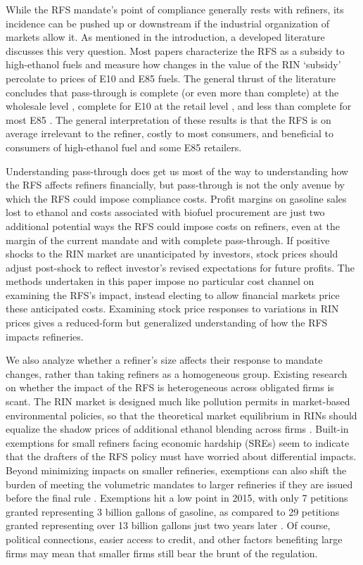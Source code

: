 \documentclass[11pt]{article}
\begin{document}
While the RFS mandate's point of compliance generally rests with refiners, its incidence can be pushed up or downstream if the industrial organization of markets allow it. As mentioned in the introduction, a developed literature discusses this very question. Most papers characterize the RFS as a subsidy to high-ethanol fuels and measure how changes in the value of the RIN `subsidy' percolate to prices of E10 and E85 fuels. The general thrust of the literature concludes that pass-through is complete (or even more than complete) at the wholesale level \citep{Knittel2017,Burkhardt2019,Lade2019}, complete for E10 at the retail level \citep{Pouliot2017,Lade2019,Li2019}, and less than complete for most E85 \citep{Lade2019,Li2019}. The general interpretation of these results is that the RFS is on average irrelevant to the refiner, costly to most consumers, and beneficial to consumers of high-ethanol fuel and some E85 retailers.

Understanding pass-through does get us most of the way to understanding how the RFS affects refiners financially, but pass-through is not the only avenue by which the RFS could impose compliance costs. Profit margins on gasoline sales lost to ethanol and costs associated with biofuel procurement are just two additional potential ways the RFS could impose costs on refiners, even at the margin of the current mandate and with complete pass-through. If positive shocks to the RIN market are unanticipated by investors, stock prices should adjust post-shock to reflect investor's revised expectations for future profits. The methods undertaken in this paper impose no particular cost channel on examining the RFS's impact, instead electing to allow financial markets price these anticipated costs. Examining stock price responses to variations in RIN prices gives a reduced-form but generalized understanding of how the RFS impacts refineries. 

We also analyze whether a refiner's size affects their response to mandate changes, rather than taking refiners as a homogeneous group. Existing research on whether the impact of the RFS is heterogeneous across obligated firms is scant. The RIN market is designed much like pollution permits in market-based environmental policies, so that the theoretical market equilibrium in RINs should equalize the shadow prices of additional ethanol blending across firms \citep{Montgomery1972}. Built-in exemptions for small refiners facing economic hardship (SREs) seem to indicate that the drafters of the RFS policy must have worried about differential impacts. Beyond minimizing impacts on smaller refineries, exemptions can also shift the burden of meeting the volumetric mandates to larger refineries if they are issued before the final rule \citep{Coppess2017}. Exemptions hit a low point in 2015, with only 7 petitions granted representing 3 billion gallons of gasoline, as compared to 29 petitions granted representing over 13 billion gallons just two years later \citep{EnvironmentalProtectionAgency2018}. Of course, political connections, easier access to credit, and other factors benefiting large firms may mean that smaller firms still bear the brunt of the regulation. 
\end{document}

